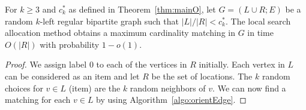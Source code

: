 \begin{corollary}
For $k\ge 3$ and $c^*_{k}$ as defined in Theorem~\ref{thm:mainO}, let $G=(L\cup R;E)$ be a random $k$-left regular bipartite graph such that ${|L| / |R| }<c^*_{k}$.  The local search allocation method obtains a maximum cardinality matching in $G$ in time $O(|R|)$ with probability $1-o(1)$.
\end{corollary}
\begin{proof}
We assign label $0$ to each of the vertices in $R$ initially. Each vertex in $L$ can be considered as an item and let $R$ be the set of locations. The $k$ random choices for $v\in L$ (item) are the $k$ random neighbors of $v$. We can now find a matching for each $v\in L$ by using Algorithm~\ref{algo:orientEdge}.
\end{proof}





